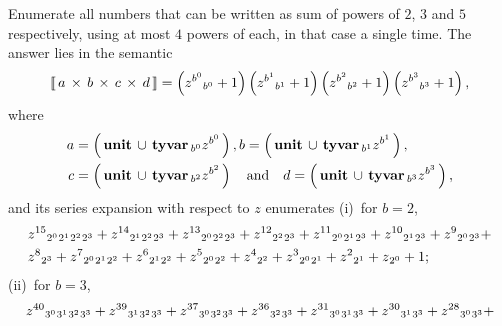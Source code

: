 \begin{example}
Enumerate all numbers that can be written as sum of powers of $2$, $3$ and $5$
respectively, using at most $4$ powers of each, in that case a single time.
The answer lies in the semantic
\begin{displaymath}
\left\llbracket\,a\,\times\,b\,\times\,c\,\times\,d\,\right\rrbracket = \left(z^{b^{0}} {\space}_{b^{0}} + 1\right) \left(z^{b^{1}} {\space}_{b^{1}} + 1\right) \left(z^{b^{2}} {\space}_{b^{2}} + 1\right) \left(z^{b^{3}} {\space}_{b^{3}} + 1\right),
\end{displaymath}
where
\begin{displaymath}
\begin{split}
    a &= \left(\,\textbf{unit}\,\cup\,\textbf{tyvar}\,{\space}_{b^{0}} z^{b^{0}}\,\right),
        b = \left(\,\textbf{unit}\,\cup\,\textbf{tyvar}\,{\space}_{b^{1}} z^{b^{1}}\,\right),\\
    c &= \left(\,\textbf{unit}\,\cup\,\textbf{tyvar}\,{\space}_{b^{2}} z^{b^{2}}\,\right)\quad\text{and}\quad
        d = \left(\,\textbf{unit}\,\cup\,\textbf{tyvar}\,{\space}_{b^{3}} z^{b^{3}}\,\right),
\end{split}
\end{displaymath}
and its series expansion with respect to $z$ enumerates (i)~for $b=2$,
\begin{displaymath}
\begin{split}
&z^{15} {\space}_{2^{0}} {\space}_{2^{1}} {\space}_{2^{2}} {\space}_{2^{3}} + z^{14} {\space}_{2^{1}} {\space}_{2^{2}} {\space}_{2^{3}} + z^{13} {\space}_{2^{0}} {\space}_{2^{2}} {\space}_{2^{3}} + z^{12} {\space}_{2^{2}} {\space}_{2^{3}} + z^{11} {\space}_{2^{0}} {\space}_{2^{1}} {\space}_{2^{3}} + z^{10} {\space}_{2^{1}} {\space}_{2^{3}} + z^{9} {\space}_{2^{0}} {\space}_{2^{3}} + \\
&z^{8} {\space}_{2^{3}} + z^{7} {\space}_{2^{0}} {\space}_{2^{1}} {\space}_{2^{2}} + z^{6} {\space}_{2^{1}} {\space}_{2^{2}} + z^{5} {\space}_{2^{0}} {\space}_{2^{2}} + z^{4} {\space}_{2^{2}} + z^{3} {\space}_{2^{0}} {\space}_{2^{1}} + z^{2} {\space}_{2^{1}} + z {\space}_{2^{0}} + 1;
\end{split}
\end{displaymath}
(ii)~for $b=3$,
\begin{displaymath}
\begin{split}
&z^{40} {\space}_{3^{0}} {\space}_{3^{1}} {\space}_{3^{2}} {\space}_{3^{3}} + z^{39} {\space}_{3^{1}} {\space}_{3^{2}} {\space}_{3^{3}} + z^{37} {\space}_{3^{0}} {\space}_{3^{2}} {\space}_{3^{3}} + z^{36} {\space}_{3^{2}} {\space}_{3^{3}} + z^{31} {\space}_{3^{0}} {\space}_{3^{1}} {\space}_{3^{3}} + z^{30} {\space}_{3^{1}} {\space}_{3^{3}} + z^{28} {\space}_{3^{0}} {\space}_{3^{3}} + \\

\end{split}
\end{displaymath}
\end{example}
